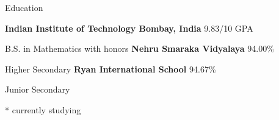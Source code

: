 \begin{rubric}{Education}

\entry*[2018 -- 2022*]%
	\textbf{Indian Institute of Technology Bombay, India} \hfill 9.83/10 GPA
	\par B.S. in Mathematics with honors
\entry*[2016 -- 2018]%
	\textbf{Nehru Smaraka Vidyalaya} \hfill 94.00\% \par
	Higher Secondary
\entry*[\hphantom{2010 --} 2016]%
	\textbf{Ryan International School} \hfill 94.67\% \par
	Junior Secondary

\vspace{1mm}

\hspace{-3cm}\footnotesize{* currently studying} 
\end{rubric}
